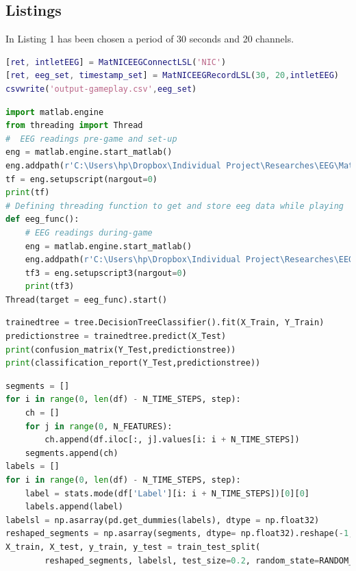 \begin{appendices}
\clearpage

\clearpage
\section{Listings}

In Listing 1 has been chosen a period of 30 seconds and 20 channels.

\begin{lstlisting}[language=MATLAB, caption= MATLAB code setupscript3.m]
[ret, intletEEG] = MatNICEEGConnectLSL('NIC')
[ret, eeg_set, timestamp_set] = MatNICEEGRecordLSL(30, 20,intletEEG)
csvwrite('output-gameplay.csv',eeg_set)
\end{lstlisting}

\begin{lstlisting}[language=python, caption=Python code added to enable EEG readings synchronisation]
import matlab.engine
from threading import Thread
#  EEG readings pre-game and set-up
eng = matlab.engine.start_matlab()
eng.addpath(r'C:\Users\hp\Dropbox\Individual Project\Researches\EEG\MatNIC_v03.08', nargout=0)
tf = eng.setupscript(nargout=0)
print(tf)
# Defining threading function to get and store eeg data while playing
def eeg_func():
    # EEG readings during-game
    eng = matlab.engine.start_matlab()
    eng.addpath(r'C:\Users\hp\Dropbox\Individual Project\Researches\EEG\MatNIC_v03.08', nargout=0)
    tf3 = eng.setupscript3(nargout=0)
    print(tf3)
Thread(target = eeg_func).start() 
\end{lstlisting}

\begin{lstlisting}[language=Python, caption=Decision Tree Code]
trainedtree = tree.DecisionTreeClassifier().fit(X_Train, Y_Train)
predictionstree = trainedtree.predict(X_Test)
print(confusion_matrix(Y_Test,predictionstree))
print(classification_report(Y_Test,predictionstree))
\end{lstlisting}

\clearpage

\begin{lstlisting}[language=Python, caption=LSTM Preprocessing]
segments = []
for i in range(0, len(df) - N_TIME_STEPS, step):
    ch = []
    for j in range(0, N_FEATURES):
        ch.append(df.iloc[:, j].values[i: i + N_TIME_STEPS])
    segments.append(ch)
labels = []
for i in range(0, len(df) - N_TIME_STEPS, step):
    label = stats.mode(df['Label'][i: i + N_TIME_STEPS])[0][0]
    labels.append(label)
labelsl = np.asarray(pd.get_dummies(labels), dtype = np.float32)
reshaped_segments = np.asarray(segments, dtype= np.float32).reshape(-1, N_TIME_STEPS, N_FEATURES)
X_train, X_test, y_train, y_test = train_test_split(
        reshaped_segments, labelsl, test_size=0.2, random_state=RANDOM_SEED)
\end{lstlisting}


\end{appendices}
